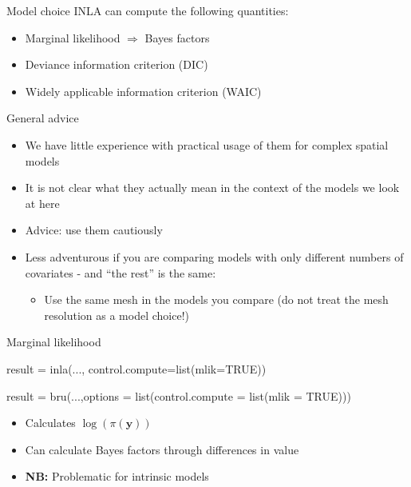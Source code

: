 \documentclass[
  ignorenonframetext,
  handout]{beamer}
\newenvironment{Shaded}{\begin{snugshade}}{\end{snugshade}}
\newcommand{\AttributeTok}[1]{\textcolor[rgb]{0.77,0.63,0.00}{#1}}
\newcommand{\ConstantTok}[1]{\textcolor[rgb]{0.00,0.00,0.00}{#1}}
\newcommand{\FunctionTok}[1]{\textcolor[rgb]{0.00,0.00,0.00}{#1}}
\newcommand{\NormalTok}[1]{#1}
\newcommand{\OtherTok}[1]{\textcolor[rgb]{0.56,0.35,0.01}{#1}}
\providecommand{\tightlist}{%
  \setlength{\itemsep}{0pt}\setlength{\parskip}{0pt}}
\begin{document}
\begin{frame}{Model choice}
\protect\hypertarget{model-choice}{}
INLA can compute the following quantities:

\begin{itemize}
\item
  Marginal likelihood \(\Rightarrow\) Bayes factors
\item
  Deviance information criterion (DIC)
\item
  Widely applicable information criterion (WAIC)
\end{itemize}
\end{frame}

\begin{frame}{General advice}
\protect\hypertarget{general-advice}{}
\begin{itemize}
\item
  We have little experience with practical usage of them for complex
  spatial models
\item
  It is not clear what they actually mean in the context of the models
  we look at here
\item
  Advice: use them cautiously
\item
  Less adventurous if you are comparing models with only different
  numbers of covariates - and ``the rest'' is the same:

  \begin{itemize}
  \tightlist
  \item
    Use the same mesh in the models you compare (do not treat the mesh
    resolution as a model choice!)
  \end{itemize}
\end{itemize}
\end{frame}

\begin{frame}[fragile]{Marginal likelihood}
\protect\hypertarget{marginal-likelihood}{}
\small

\begin{Shaded}
\begin{Highlighting}[]
\NormalTok{result }\OtherTok{=} \FunctionTok{inla}\NormalTok{(...,}
              \AttributeTok{control.compute=}\FunctionTok{list}\NormalTok{(}\AttributeTok{mlik=}\ConstantTok{TRUE}\NormalTok{))}

\NormalTok{result }\OtherTok{=} \FunctionTok{bru}\NormalTok{(...,}\AttributeTok{options =} \FunctionTok{list}\NormalTok{(}\AttributeTok{control.compute =} 
                                  \FunctionTok{list}\NormalTok{(}\AttributeTok{mlik =} \ConstantTok{TRUE}\NormalTok{)))}
\end{Highlighting}
\end{Shaded}

\normalsize

\begin{itemize}
\item
  Calculates \(\log(\pi(\boldsymbol{y}))\)
\item
  Can calculate Bayes factors through differences in value
\item
  \textbf{NB:} Problematic for intrinsic models
\end{itemize}
\end{frame}
\end{document}
